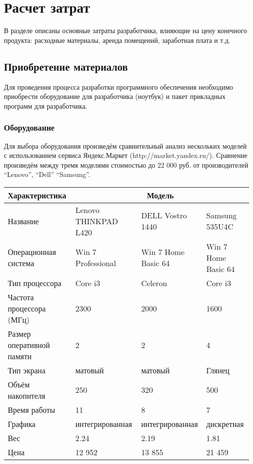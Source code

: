 \section{Расчет затрат}

В разделе описаны основные затраты разработчика, влияющие на цену конечного продукта: расходные материалы, аренда помещений, заработная плата и т.д.

\subsection{Приобретение материалов}

Для проведения процесса разработки программного обеспечения необхо\-димо приобрести оборудование для разработчика (ноутбук) и пакет прик\-ладных программ для разработчика.

\subsubsection{Оборудование}
Для выбора оборудования произведём сравнительный анализ нескольких моделей с использованием сервиса Яндекс.Маркет (http://market.yandex.ru/).
Сравнение произведём между тремя моделями стоимостью до 22 000 руб. от производителей “Lenovo”, “Dell” “Samsung”.

\begin{table}[H]
\begin{center}
\begin{tabular}{|p{3.5cm}|p{3.6cm}|p{3.6cm}|p{3.4cm}|}
\hline
Характеристика & \multicolumn{3}{|c|}{Модель}\\
\hline
Название&
Lenovo THINKPAD L420&
DELL Vostro 1440&
Samsung 535U4C\\
\hline
Операционная система&
Win 7 Professional&
Win 7 Home Basic 64&
Win 7 Home Basic 64\\
\hline
Тип процессора&
Core i3&
Celeron&
Core i3\\
\hline
Частота процессора (МГц)&
2300&
2000&
1600\\
\hline
Размер оперативной памяти&
2&
2&
4\\
\hline
Тип экрана&
матовый&
матовый&
Глянец\\
\hline
Объём накопителя&
250&
320&
500\\
\hline
Время работы&
11&
8&
7\\
\hline
Графика&
интегрированная&
интегрированная&
дискретная\\
\hline
Вес&
2.24&
2.19&
1.81\\
\hline
Цена&
12 952&
13 855&
21 459\\
\hline
\end{tabular}
\end{center}
\end{table}

